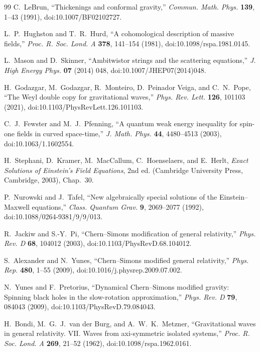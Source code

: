 \documentclass[aps,prd,reprint,nofootinbib,superscriptaddress]{revtex4-2}
\theoremstyle{definition}
\theoremstyle{remark}
\begin{document}
\begin{thebibliography}{99}
C.~LeBrun,
``Thickenings and conformal gravity,''
\emph{Commun. Math. Phys.} \textbf{139}, 1--43 (1991),
doi:10.1007/BF02102727.

L.~P.~Hughston and T.~R.~Hurd,
``A cohomological description of massive fields,''
\emph{Proc. R. Soc. Lond. A} \textbf{378}, 141--154 (1981),
doi:10.1098/rspa.1981.0145.

L.~Mason and D.~Skinner,
``Ambitwistor strings and the scattering equations,''
\emph{J. High Energy Phys.} \textbf{07} (2014) 048,
doi:10.1007/JHEP07(2014)048.

H.~Godazgar, M.~Godazgar, R.~Monteiro, D.~Peinador Veiga, and C.~N.~Pope,
``The Weyl double copy for gravitational waves,''
\emph{Phys. Rev. Lett.} \textbf{126}, 101103 (2021),
doi:10.1103/PhysRevLett.126.101103.

C.~J.~Fewster and M.~J.~Pfenning,
``A quantum weak energy inequality for spin-one fields in curved space-time,''
\emph{J. Math. Phys.} \textbf{44}, 4480--4513 (2003),
doi:10.1063/1.1602554.

H.~Stephani, D.~Kramer, M.~MacCallum, C.~Hoenselaers, and E.~Herlt,
\emph{Exact Solutions of Einstein's Field Equations}, 2nd ed.
(Cambridge University Press, Cambridge, 2003), Chap.~30.

P.~Nurowski and J.~Tafel,
``New algebraically special solutions of the Einstein--Maxwell equations,''
\emph{Class. Quantum Grav.} \textbf{9}, 2069--2077 (1992),
doi:10.1088/0264-9381/9/9/013.

R.~Jackiw and S.-Y.~Pi,
``Chern--Simons modification of general relativity,''
\emph{Phys. Rev. D} \textbf{68}, 104012 (2003),
doi:10.1103/PhysRevD.68.104012.

S.~Alexander and N.~Yunes,
``Chern--Simons modified general relativity,''
\emph{Phys. Rep.} \textbf{480}, 1--55 (2009),
doi:10.1016/j.physrep.2009.07.002.

N.~Yunes and F.~Pretorius,
``Dynamical Chern--Simons modified gravity: Spinning black holes in the slow-rotation approximation,''
\emph{Phys. Rev. D} \textbf{79}, 084043 (2009),
doi:10.1103/PhysRevD.79.084043.



H.~Bondi, M.~G.~J.~van der Burg, and A.~W.~K.~Metzner,
``Gravitational waves in general relativity. VII. Waves from axi-symmetric isolated systems,''
\emph{Proc. R. Soc. Lond. A} \textbf{269}, 21--52 (1962),
doi:10.1098/rspa.1962.0161.


\end{thebibliography}
\end{document}
